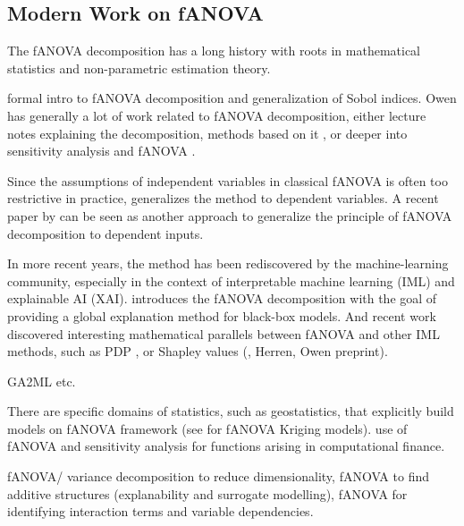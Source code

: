 \subsection{Modern Work on fANOVA}
The fANOVA decomposition has a long history with roots in mathematical statistics and non-parametric estimation theory.

\cite{owen2013} formal intro to fANOVA decomposition and generalization of Sobol indices.
Owen has generally a lot of work related to fANOVA decomposition, either lecture notes explaining the decomposition, methods based on it \cite{owen2003}, or deeper into sensitivity analysis and fANOVA \cite{owen2013}.

Since the assumptions of independent variables in classical fANOVA is often too restrictive in practice, \cite{hooker2007} generalizes the method to dependent variables. A recent paper by \cite{ilidrissi2025} can be seen as another approach to generalize the principle of fANOVA decomposition to dependent inputs.\par

In more recent years, the method has been rediscovered by the machine-learning community, especially in the context of interpretable machine learning (IML) and explainable AI (XAI). \cite{hooker2004} introduces the fANOVA decomposition with the goal of providing a global explanation method for black-box models.
And recent work discovered interesting mathematical parallels between fANOVA and other IML methods, such as PDP \cite{friedman2001}, or Shapley values (\cite{fumagalli2025}, Herren, Owen preprint).

GA2ML etc.

There are specific domains of statistics, such as geostatistics, that explicitly build models on fANOVA framework (see \cite{muehlenstaedt2012} for fANOVA Kriging models).
\cite{liu2006} use of fANOVA and sensitivity analysis for functions arising in computational finance.

fANOVA/ variance decomposition to reduce dimensionality, fANOVA to find additive structures (explanability and surrogate modelling), fANOVA for identifying interaction terms and variable dependencies.